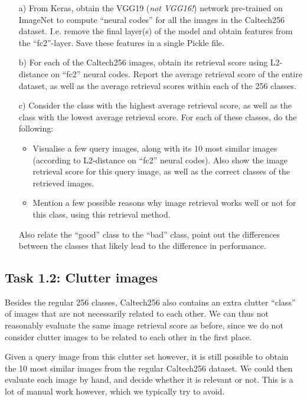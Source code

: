 \documentclass[a4paper,twoside,10pt]{article}
\begin{document}
\begin{itemize}
  \item[a)] From Keras, obtain the VGG19 (\emph{not VGG16!}) network pre-trained on ImageNet to compute ``neural codes'' for all the images in the Caltech256 dataset. I.e. remove the final layer(s) of the model and obtain features from the ``fc2''-layer. Save these features in a single Pickle file.
  \item[b)] For each of the Caltech256 images, obtain its retrieval score using L2-distance on ``fc2'' neural codes. Report the average retrieval score of the entire dataset, as well as the average retrieval scores within each of the 256 classes.
  \item[c)] Consider the class with the highest average retrieval score, as well as the class with the lowest average retrieval score. For each of these classes, do the following:
  \begin{itemize}
    \item Visualise a few query images, along with its 10 most similar images (according to L2-distance on ``fc2'' neural codes). Also show the image retrieval score for this query image, as well as the correct classes of the retrieved images.
    \item Mention a few possible reasons why image retrieval works well or not for this class, using this retrieval method.
  \end{itemize}
  Also relate the ``good'' class to the ``bad'' class, point out the differences between the classes that likely lead to the difference in performance.
\end{itemize}

\subsection*{Task 1.2: Clutter images}
Besides the regular 256 classes, Caltech256 also contains an extra clutter ``class'' of images that are not necessarily related to each other. We can thus not reasonably evaluate the same image retrieval score as before, since we do not consider clutter images to be related to each other in the first place.

Given a query image from this clutter set however, it is still possible to obtain the 10 most similar images from the regular Caltech256 dataset. We could then evaluate each image by hand, and decide whether it is relevant or not. This is a lot of manual work however, which we typically try to avoid.
\end{document}
